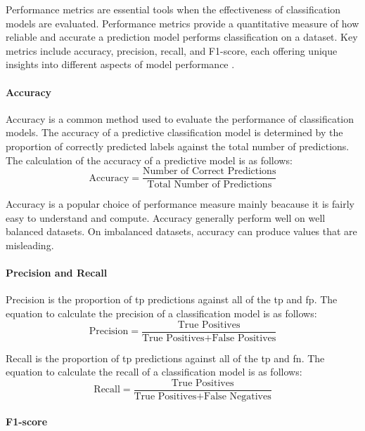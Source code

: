 \documentclass[10pt, conference]{IEEEtran}
\begin{document}
Performance metrics are essential tools when the effectiveness of classification models are evaluated. Performance metrics
provide a quantitative measure of how reliable and accurate a prediction model performs classification on a dataset.
Key metrics include accuracy, precision, recall, and F1-score, each offering unique insights into different aspects
of model performance \cite{Performance_ref}.

\paragraph{Accuracy}
Accuracy is a common method used to evaluate the performance of classification models. The accuracy of
a predictive classification model is determined by the proportion of correctly predicted labels against
the total number of predictions. The calculation of the accuracy of a predictive model is as follows:
\begin{equation}
    \text{Accuracy} = \frac{\text{Number of Correct Predictions}}{\text{Total Number of Predictions}} \label{accuracy}
\end{equation}

Accuracy is a popular choice of performance measure mainly beacause it is fairly easy to understand and compute.
Accuracy generally perform well on well balanced datasets. On imbalanced datasets, accuracy can produce
values that are misleading.

\paragraph{Precision and Recall}
Precision is the proportion of \acrfull{tp} predictions against all of the \acrshort{tp} and \acrfull{fp}.
The equation to calculate the precision of a classification model is as follows:
\begin{equation}
    \text{Precision} = \frac{\text{True Positives}}{\text{True Positives} + \text{False Positives}} \label{Precision}
\end{equation}

Recall is the proportion of \acrshort{tp} predictions against all of the \acrshort{tp} and \acrfull{fn}.
The equation to calculate the recall of a classification model is as follows:
\begin{equation}
    \text{Recall} = \frac{\text{True Positives}}{\text{True Positives} + \text{False Negatives}} \label{Recall}
\end{equation}

\paragraph{F1-score}
\end{document}
